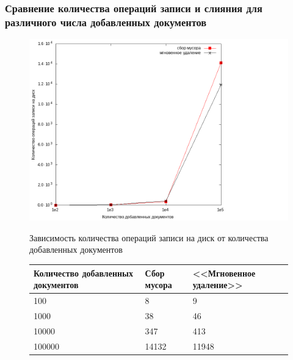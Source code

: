 \documentclass[aspectratio=169, pdf, 8pt, unicode]{beamer}
\begin{document}
\begin{frame}[fragile]
\frametitle{Сравнение количества операций записи и слияния для различного числа добавленных документов}
\begin{figure}[H]
\centering
\begin{minipage}[h]{0.55\linewidth}
\includegraphics[width=1\textwidth]{fig/writecalls.png}
\caption{Зависимость количества операций записи на диск от количества добавленных документов}
\end{minipage}
\begin{minipage}[h]{0.35\linewidth}
\caption{Время работы алгоритмов, с}
\begin{table}[H]
      \centering
      \small
      \singlespacing
      \begin{tabular}{|p{1.5cm}|p{1.5cm}|p{1.5cm}|}
        \hline
        Количество добавленных документов   & Сбор мусора                 & <<Мгновенное удаление>>     \\ \hline \hline
            100                                 & 8                           & 9                           \\ \hline
            1000                                & 38                          & 46                          \\ \hline
            10000                               & 347                         & 413                         \\ \hline
            100000                              & 14132                       & 11948                       \\ \hline
\end{tabular}
\end{table}
\end{minipage}
\end{figure}
\end{frame}
\end{document}
